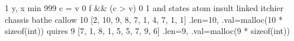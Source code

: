 \expandafter\def\csname cpp:swap\endcsname{1}
\expandafter\def\csname cpp:PARAM(x,y)\endcsname{y, x}
\expandafter\def\csname cpp:comp\endcsname{min}
\expandafter\def\csname cpp:INIT\endcsname{999}
\expandafter\def\csname cpp:PROCESS(c,v)\endcsname{c = v}
\expandafter\def\csname cpp:NOT\endcsname{0}
\expandafter\def\csname cpp:COND(f,c,v)\endcsname{f && (c > v)}
\expandafter\def\csname cpp:FALSE\endcsname{0}
\expandafter\def\csname cpp:TRUE\endcsname{1}
\expandafter\def\csname cpp:join\endcsname{and}
\expandafter\def\csname cpp:FORALLIN\endcsname{states}
\expandafter\def\csname cpp:A\endcsname{atom}
\expandafter\def\csname cpp:B\endcsname{insult}
\expandafter\def\csname cpp:C\endcsname{linked}
\expandafter\def\csname cpp:I\endcsname{itchier}
\expandafter\def\csname cpp:J\endcsname{chassis}
\expandafter\def\csname cpp:F\endcsname{bathe}
\expandafter\def\csname cpp:U\endcsname{callow}
\expandafter\def\csname cpp:TABU_LEN\endcsname{10}
\expandafter\def\csname cpp:TABU_VAL\endcsname{[2, 10, 9, 8, 7, 1, 4, 7, 1, 1]}
\expandafter\def\csname cpp:TABU\endcsname{{.len=10, .val=malloc(10 * sizeof(int))}}
\expandafter\def\csname cpp:V\endcsname{quires}
\expandafter\def\csname cpp:TABV_LEN\endcsname{9}
\expandafter\def\csname cpp:TABV_VAL\endcsname{[7, 1, 8, 1, 5, 5, 7, 9, 6]}
\expandafter\def\csname cpp:TABV\endcsname{{.len=9, .val=malloc(9 * sizeof(int))}}

\def\C#1{\csname cpp:#1\endcsname}

